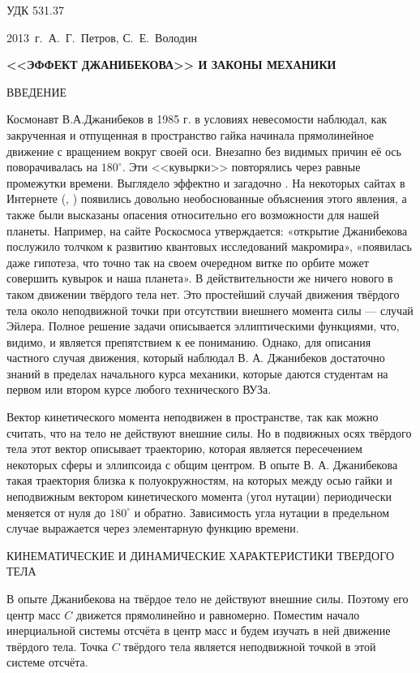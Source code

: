 \documentclass[14pt,a4paper]{extarticle}
\begin{document}
УДК 531.37

\smallskip


\centerline{2013~г.~{А.~Г.~Петров, С.~Е.~Володин}}

\smallskip

\centerline{\bf <<ЭФФЕКТ ДЖАНИБЕКОВА>> И ЗАКОНЫ МЕХАНИКИ}

\bigskip

ВВЕДЕНИЕ

Космонавт В.А.Джанибеков в 1985 г. в условиях невесомости наблюдал, как закрученная и отпущенная в пространство гайка начинала прямолинейное движение с вращением вокруг своей оси. Внезапно без видимых причин её ось поворачивалась на $ 180^\circ$. Эти <<кувырки>> повторялись через равные промежутки времени. Выглядело эффектно и загадочно \cite{video}.  На некоторых сайтах в Интернете (\cite{federalspace}, \cite{ixbt})  появились довольно необоснованные объяснения этого явления, а также были высказаны опасения относительно его возможности для нашей планеты. Например, на сайте Роскосмоса утверждается: «открытие Джанибекова послужило толчком к развитию квантовых исследований макромира», «появилась даже гипотеза, что точно так на своем очередном витке по орбите может совершить кувырок и наша планета». В действительности же ничего нового в таком движении твёрдого тела нет. Это простейший случай движения твёрдого тела около неподвижной точки при отсутствии внешнего момента силы --- случай Эйлера. Полное решение задачи описывается эллиптическими функциями, что, видимо, и является препятствием к ее пониманию. Однако, для описания частного случая движения, который наблюдал В. А. Джанибеков достаточно  знаний в пределах начального курса механики, которые даются студентам на первом или втором курсе любого технического ВУЗа.

Вектор кинетического момента неподвижен в пространстве, так как можно считать, что на тело не действуют внешние силы. Но в подвижных осях твёрдого тела этот вектор описывает траекторию, которая является пересечением некоторых сферы и эллипсоида с общим центром. В опыте В. А. Джанибекова такая траектория близка к полуокружностям, на которых между осью гайки и неподвижным вектором кинетического момента (угол нутации) периодически меняется от нуля до $180^\circ$ и обратно. Зависимость угла нутации в предельном случае выражается через элементарную функцию времени.

КИНЕМАТИЧЕСКИЕ И ДИНАМИЧЕСКИЕ ХАРАКТЕРИСТИКИ ТВЕРДОГО ТЕЛА

В опыте Джанибекова на твёрдое тело не действуют внешние силы. Поэтому его центр масс $C$ движется прямолинейно и равномерно. Поместим начало инерциальной системы отсчёта в центр масс и будем изучать в ней движение твёрдого тела. Точка $C$ твёрдого тела является неподвижной  точкой в этой системе отсчёта.
\end{document}
